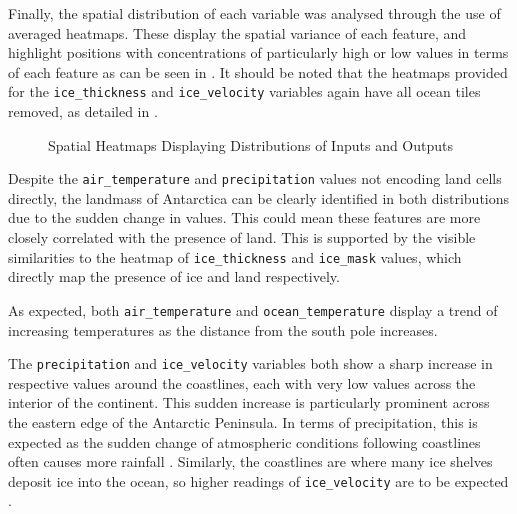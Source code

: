Finally, the spatial distribution of each variable was analysed through the use of averaged heatmaps. These display the spatial variance of each feature, and highlight positions with concentrations of particularly high or low values in terms of each feature as can be seen in . It should be noted that the heatmaps provided for the \texttt{ice\_thickness} and \texttt{ice\_velocity} variables again have all ocean tiles removed, as detailed in .
\begin{figure}[H]
  \centering
  \caption{Spatial Heatmaps Displaying Distributions of Inputs and Outputs}
  \label{fig:heatmaps}
\end{figure}

Despite the \texttt{air\_temperature} and \texttt{precipitation} values not encoding land cells directly, the landmass of Antarctica can be clearly identified in both distributions due to the sudden change in values. This could mean these features are more closely correlated with the presence of land. This is supported by the visible similarities to the heatmap of \texttt{ice\_thickness} and \texttt{ice\_mask} values, which directly map the presence of ice and land respectively.

As expected, both \texttt{air\_temperature} and \texttt{ocean\_temperature} display a trend of increasing temperatures as the distance from the south pole increases. 

The \texttt{precipitation} and \texttt{ice\_velocity} variables both show a sharp increase in respective values around the coastlines, each with very low values across the interior of the continent. This sudden increase is particularly prominent across the eastern edge of the Antarctic Peninsula. In terms of precipitation, this is expected as the sudden change of atmospheric conditions following coastlines often causes more rainfall \cite{Bromwich1990}. Similarly, the coastlines are where many ice shelves deposit ice into the ocean, so higher readings of \texttt{ice\_velocity} are to be expected \cite{Mouginot2019}.

